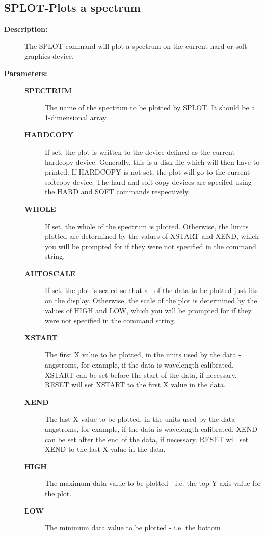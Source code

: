 \subsection{SPLOT-\label{SPLOT}Plots a spectrum}
\begin{description}

\item [{\bf Description:}]
 The SPLOT command will plot a spectrum on the current
 hard or soft graphics device.

\item [{\bf Parameters:}]
\begin{description}
\item [{\bf SPECTRUM}]
 The name of the spectrum to be plotted by SPLOT.
 It should be a 1-dimensional array.
\item [{\bf HARDCOPY}]
 If set, the plot is written to the device defined
 as the current hardcopy device.  Generally, this
 is a disk file which will then have to printed.  If
 HARDCOPY is not set, the plot will go to the current
 softcopy device.  The hard and soft copy devices are
 specifed using the HARD and SOFT commands respectively.
\item [{\bf WHOLE}]
 If set, the whole of the spectrum is plotted.
 Otherwise, the limits plotted are determined by the values of
 XSTART and XEND, which you will be prompted for if they were
 not specified in the command string.
\item [{\bf AUTOSCALE}]
 If set, the plot is scaled so that all of the data to be
 plotted just fits on the display.  Otherwise, the scale of
 the plot is determined by the values of HIGH and LOW, which
 you will be prompted for if they were not specified in the
 command string.
\item [{\bf XSTART}]
 The first X value to be plotted, in the
 units used by the data - angstroms, for example, if the data
 is wavelength calibrated.  XSTART can be set before the start
 of the data, if necessary.  RESET will set XSTART to the first
 X value in the data.
\item [{\bf XEND}]
 The last X value to be plotted, in the units
 used by the data - angstroms, for example, if the data
 is wavelength calibrated.  XEND can be set after the end
 of the data, if necessary.  RESET will set XEND to the last
 X value in the data.
\item [{\bf HIGH}]
 The maximum data value to be plotted - i.e. the top
 Y axis value for the plot.
\item [{\bf LOW}]
 The minimum data value to be plotted - i.e. the bottom

\end{description}
\end{description}
